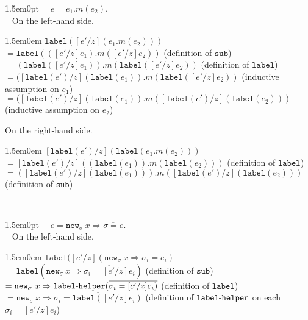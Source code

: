 \documentclass{llncs}
\newcommand{\keywadj}[1]{\mathtt{#1}}
\newcommand{\kwa}[1]{\keywadj{ #1 }}
\newcommand{\hyphen}{\hbox{-}}
\newcommand{\proofcase}[2]{
	\begin{adjustwidth}{1.5em}{0pt}
		\fbox{Case.}~~#1. \\ ~#2
	\end{adjustwidth}
}
\newcommand{\newsig}[0]{
	\keywadj{new}_\sigma~x \Rightarrow \overline{\sigma = e}
}
\begin{document}
{\proofcase{$e = e_1.m(e_2)$}{
On the left-hand side.
\begin{adjustwidth}{1.5em}{0em}
$\kwa{label}([e'/z](e_1.m(e_2)))$ \\
$= \kwa{label}(([e'/z]e_1).m([e'/z]e_2)) $
\tabto{26em} (definition of $\kwa{sub}$)\\
$= (\kwa{label}([e'/z]e_1)).m(\kwa{label}([e'/z]e_2))$
\tabto{26em} (definition of $\kwa{label}$)\\
$= ([\kwa{label}(e')/z](\kwa{label}(e_1)).m(\kwa{label}([e'/z]e_2))$
\tabto{26em} (inductive assumption on $e_1$) \\
$= ([\kwa{label}(e')/z](\kwa{label}(e_1)).m([\kwa{label}(e')/z](\kwa{label}(e_2)))$
\tabto{26em} (inductive assumption on $e_2$) \\
\end{adjustwidth}

\noindent
On the right-hand side.
\begin{adjustwidth}{1.5em}{0em}
$[\kwa{label}(e')/z](\kwa{label}(e_1.m(e_2)))$ \\
$= [\kwa{label}(e')/z]((\kwa{label}(e_1)).m(\kwa{label}(e_2)))$
\tabto{28em} (definition of $\kwa{label}$)\\
$= ( [\kwa{label}(e')/z](\kwa{label}(e_1)) ).m( [\kwa{label}(e')/z](\kwa{label}(e_2)) )$
\tabto{28em} (definition of $\kwa{sub}$)
\end{adjustwidth}~
}

\proofcase{$e = \newsig$}{
On the left-hand side.
\begin{adjustwidth}{1.5em}{0em}
$\kwa{label}([e'/z](\kwa{new}_\sigma~x \Rightarrow \overline{\sigma_i = e_i})$ \\
$=\kwa{label}(\kwa{new}_\sigma~x \Rightarrow \overline{\sigma_i = [e'/z]e_i})$
\tabto{20em} (definition of $\kwa{sub}$) \\
$= \kwa{new}_\sigma~x \Rightarrow \kwa{label \hyphen helper}(\overline{\sigma_i = [e'/z]e_i)}$
\tabto{20em} (definition of $\kwa{label}$) \\
$= \kwa{new}_\sigma~x \Rightarrow \overline{\sigma_i = \kwa{label}([e'/z]e_i)}$
\tabto{20em} (definition of $\kwa{label \hyphen helper}$ on each $\sigma_i = [e'/z]e_i$) \\
\end{adjustwidth}

}}
\end{document}
